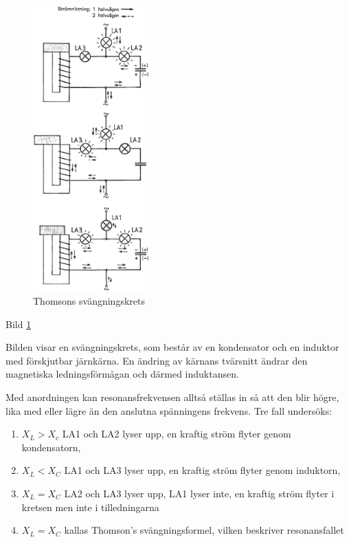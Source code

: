 \begin{figure}[h]
\begin{center}
  \includegraphics[width=0.4\textwidth]{images/cropped_pdfs/bild_2_3-17.pdf}
  \caption{Thomsons svängningskrets}
  \label{fig:BildII3-17}
\end{center}
\end{figure}

Bild \ref{fig:BildII3-17}

Bilden visar en svängningskrets, som består av en kondensator och en induktor
med förskjutbar järnkärna. En ändring av kärnans tvärsnitt ändrar den
magnetiska ledningsförmågan och därmed induktansen.

Med anordningen kan resonansfrekvensen alltså ställas in så att den blir högre,
lika med eller lägre än den anslutna spänningens frekvens. Tre fall undersöks:
\begin{enumerate}
\item \(X_L > X_c\) LA1 och LA2 lyser upp, en kraftig ström flyter genom
  kondensatorn,
\item \(X_L < X_C\) LA1 och LA3 lyser upp, en kraftig ström flyter genom
  induktorn,
\item \(X_L= X_C\) LA2 och LA3 lyser upp, LA1 lyser inte, en kraftig ström
  flyter i kretsen men inte i tilledningarna
\item \(X_L = X_C\) kallas Thomson's svängningsformel, vilken beskriver
  resonansfallet
\end{enumerate}

